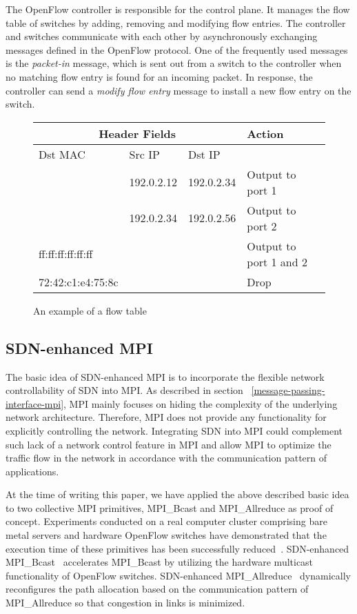 The OpenFlow controller is responsible for the control plane. It manages
the flow table of switches by adding, removing and modifying flow
entries. The controller and switches communicate with each other by
asynchronously exchanging messages defined in the OpenFlow protocol. One
of the frequently used messages is the \emph{packet-in} message, which
is sent out from a switch to the controller when no matching flow entry
is found for an incoming packet. In response, the controller can send a
\emph{modify flow entry} message to install a new flow entry on the
switch.

\begin{figure}[htb]
    \centering
    \footnotesize
    \begin{tabular}{lllll}
        \hline
        \multicolumn{3}{c}{Header Fields}            &  Action                  \\ \hline
        Dst MAC           & Src IP     & Dst IP      &                          \\ \hline
                          & 192.0.2.12 & 192.0.2.34  & Output to port 1         \\
                          & 192.0.2.34 & 192.0.2.56  & Output to port 2         \\
        ff:ff:ff:ff:ff:ff &            &             & Output to port 1 and 2   \\
        72:42:c1:e4:75:8c &            &             & Drop
    \end{tabular}
    \caption{An example of a flow table}
    \label{tbl:flow-table}
\end{figure}

\hypertarget{sdn-enhanced-mpi}{%
\subsection{SDN-enhanced MPI}\label{sdn-enhanced-mpi}}

The basic idea of SDN-enhanced MPI is to incorporate the flexible
network controllability of SDN into MPI\@. As described in section
~\ref{message-passing-interface-mpi}, MPI mainly focuses on hiding the
complexity of the underlying network architecture. Therefore, MPI does
not provide any functionality for explicitly controlling the network.
Integrating SDN into MPI could complement such lack of a network control
feature in MPI and allow MPI to optimize the traffic flow in the network
in accordance with the communication pattern of applications.

At the time of writing this paper, we have applied the above described
basic idea to two collective MPI primitives, MPI\_Bcast and
MPI\_Allreduce as proof of concept. Experiments conducted on a real
computer cluster comprising bare metal servers and hardware OpenFlow
switches have demonstrated that the execution time of these primitives
has been successfully reduced~\autocites{Dashdavaa2014}{Takahashi2014}.
SDN-enhanced MPI\_Bcast~\autocite{Dashdavaa2014} accelerates MPI\_Bcast
by utilizing the hardware multicast functionality of OpenFlow switches.
SDN-enhanced MPI\_Allreduce~\autocite{Takahashi2014} dynamically
reconfigures the path allocation based on the communication pattern of
MPI\_Allreduce so that congestion in links is minimized.

